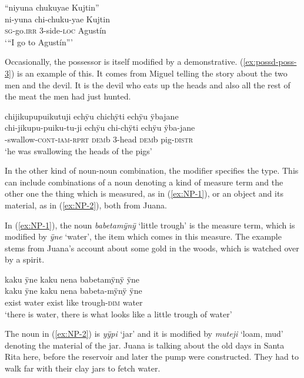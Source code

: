 {\ea\label{ex:possd-poss-2}
\begingl
\glpreamble “niyuna chukuyae Kujtin”\\
\gla ni-yuna chi-chuku-yae Kujtin\\
\textsc{sg}-go.\textsc{irr} 3-side-\textsc{loc} Agustín\\
\glft ‘“I go to Agustín”’
\endgl
\trailingcitation{[jxx-p120430l-2.392]}
\xe

Occasionally, the possessor is itself modified by a demonstrative. (\ref{ex:possd-poss-3}) is an example of this. It comes from Miguel telling the story about the two men and the devil. It is the devil who eats up the heads and also all the rest of the meat the men had just hunted.

\ea\label{ex:possd-poss-3}
\begingl 
\glpreamble chijikupupuikutuji echÿu chichÿti echÿu ÿbajane\\
\gla chi-jikupu-puiku-tu-ji echÿu chi-chÿti echÿu ÿba-jane\\ 
-swallow-\textsc{cont}-\textsc{iam}-\textsc{rprt} \textsc{dem}b 3-head \textsc{dem}b pig-\textsc{distr}\\ 
\glft ‘he was swallowing the heads of the pigs’
\trailingcitation{[mxx-n101017s-1.052-053]} 
\xe
{}

In the other kind of noun-noun combination, the modifier specifies the type. This can include combinations of a noun denoting a kind of measure term and the other one the thing which is measured, as in (\ref{ex:NP-1}), or an object and its material, as in (\ref{ex:NP-2}), both from Juana.

In (\ref{ex:NP-1}), the  noun \textit{babetamÿnÿ} ‘little trough’ is the measure term, which is modified by \textit{ÿne} ‘water’, the item which comes in this measure. The example stems from Juana’s account about some gold in the woods, which is watched over by a spirit.

\ea\label{ex:NP-1}
\begingl
\glpreamble kaku ÿne kaku nena babetamÿnÿ ÿne\\
\gla kaku ÿne kaku nena babeta-mÿnÿ ÿne\\
\glb exist water exist like trough-\textsc{dim} water\\
\glft ‘there is water, there is what looks like a little trough of water’
\endgl
\trailingcitation{[jxx-p151020l-2]}
\xe

The  noun in (\ref{ex:NP-2}) is \textit{yÿpi} ‘jar’ and it is modified by \textit{muteji} ‘loam, mud’ denoting the material of the jar. Juana is talking about the old days in Santa Rita here, before the reservoir and later the pump were constructed. They had to walk far with their clay jars to fetch water.

}
